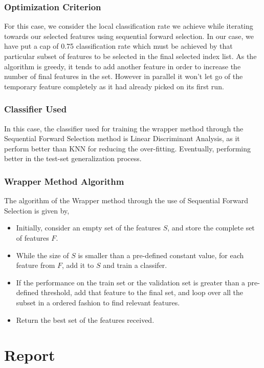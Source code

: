 \documentclass[12pt,twoside,a4paper]{article}
\begin{document}
\subsubsection*{Optimization Criterion}
For this case, we consider the local classification rate we achieve while iterating towards our selected features using sequential forward selection. In our case, we have put a cap of 0.75 classification rate which must be achieved by that particular subset of features to be selected in the final selected index list. As the algorithm is greedy,  it tends to add another feature in order to increase the number of final features in the set. However in parallel it won’t let go of the temporary feature completely as it had already picked on its first run.

\subsubsection*{Classifier Used}
In this case, the classifier used for training the wrapper method through the Sequential Forward Selection method is Linear Discriminant Analysis, as it perform better than KNN for reducing the over-fitting. Eventually, performing better in the test-set generalization process.

\subsubsection*{Wrapper Method Algorithm}
The algorithm of the Wrapper method through the use of Sequential Forward Selection is given by,

\begin{itemize}
    \item Initially, consider an empty set of the features $S$, and store the complete set of features $F$.
    \item While the size of $S$ is smaller than a pre-defined constant value, for each feature from $F$, add it to $S$ and train a classifer.
    \item If the performance on the train set or the validation set is greater than a pre-defined threshold, add that feature to the final set, and loop over all the subset in a ordered fashion to find relevant features.
    \item Return the best set of the features received.
\end{itemize}


\section{Report}
\end{document}
